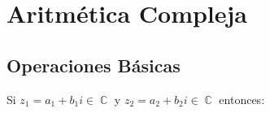 \documentclass[12pt, fleqn]{report}                             %
\DeclareMathOperator \Complexs  {\mathbb{C}}                     %
\begin{document}
    \chapter{Aritmética Compleja}

        \clearpage
        \section{Operaciones Básicas}
            Si $z_1 = a_1 + b_1i \in \Complexs$ y $z_2 = a_2 + b_2i \in \Complexs$ entonces:
\end{document}

